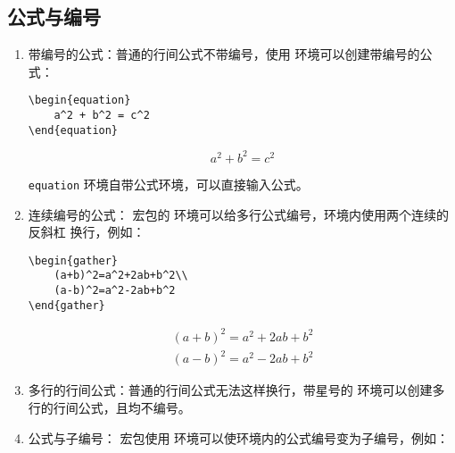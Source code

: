 \subsection{公式与编号}
\begin{enumerate}

\item 带编号的公式：普通的行间公式不带编号，使用  环境可以创建带编号的公式：

\begin{tcolorbox}[sidebyside]
\begin{lstlisting}
\begin{equation}
    a^2 + b^2 = c^2
\end{equation}
\end{lstlisting} 

\tcblower

\begin{equation}
    a^2 + b^2 = c^2
\end{equation}
\end{tcolorbox}

\verb|equation| 环境自带公式环境，可以直接输入公式。

\item 连续编号的公式： 宏包的  环境可以给多行公式编号，环境内使用两个连续的反斜杠 \boxforcmd{\\\\} 换行，例如：

\begin{tcolorbox}[sidebyside]
\begin{lstlisting}
\begin{gather}
    (a+b)^2=a^2+2ab+b^2\\
    (a-b)^2=a^2-2ab+b^2
\end{gather}
\end{lstlisting} 

\tcblower

\begin{gather}
    (a+b)^2=a^2+2ab+b^2\\
    (a-b)^2=a^2-2ab+b^2
\end{gather}
\end{tcolorbox}

\item 多行的行间公式：普通的行间公式无法这样换行，带星号的  环境可以创建多行的行间公式，且均不编号。

\item 公式与子编号： 宏包使用  环境可以使环境内的公式编号变为子编号，例如：


\end{enumerate}
